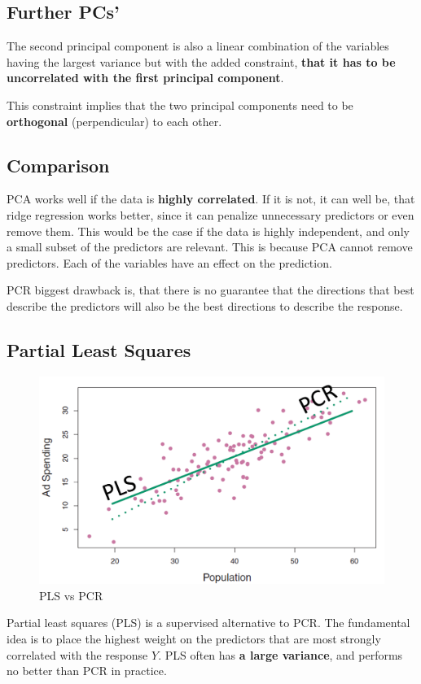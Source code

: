 \documentclass[../Main.tex]{subfiles}
\begin{document}
\subsection{Further PCs'}
The second principal component is 
also a linear combination of the 
variables having the largest variance 
but with the added constraint, \textbf{that it 
has to be uncorrelated with the first 
principal component}.

This constraint implies that the two 
principal components need to be 
\textbf{orthogonal} (perpendicular) to each 
other.

\subsection{Comparison}
PCA works well if the data is \textbf{highly correlated}.
If it is not, it can well be, that ridge regression works better,
since it can penalize unnecessary predictors or even remove them.
This would be the case if the data is highly independent,
and only a small subset of the predictors are relevant.
This is because PCA cannot remove predictors. Each of the variables
have an effect on the prediction.

PCR biggest drawback is, that there is 
no guarantee that the directions that 
best describe the predictors will also 
be the best directions to describe the 
response.

\subsection{Partial Least Squares}

\begin{figure}[H]
    \centering
    \includegraphics[width=0.75\linewidth]{Images/pcr-pls.png}
    \caption{PLS vs PCR}
\end{figure}
Partial least squares (PLS) is a 
supervised alternative to PCR.
The fundamental idea is to place the highest weight on the predictors that are most strongly 
correlated with the response \(Y\).
PLS often has \textbf{a large variance}, and performs no better than PCR in practice.
\end{document}
